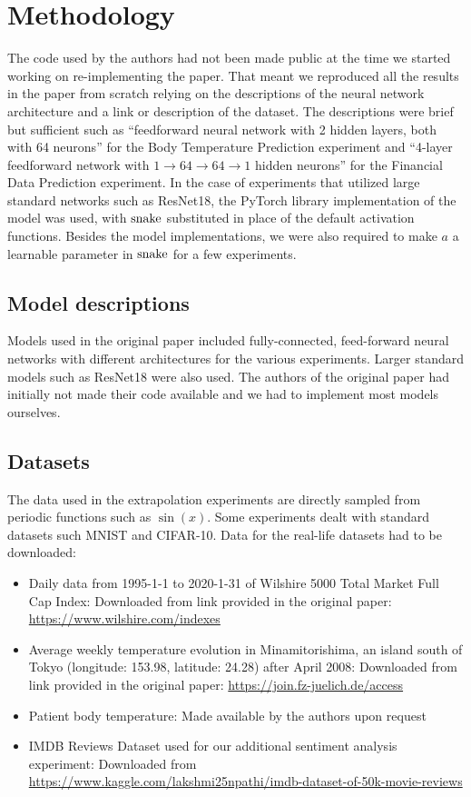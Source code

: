 \section{Methodology}

The code used by the authors had not been made public at the time we started working on re-implementing the paper. That meant we reproduced all the results in the paper from scratch relying on the descriptions of the neural network architecture and a link or description of the dataset.
The descriptions were brief but sufficient such as ``feedforward neural network with 2 hidden layers, both with 64 neurons'' for the Body Temperature Prediction experiment and ``4-layer feedforward network with $ 1 \rightarrow 64 \rightarrow 64 \rightarrow 1 $ hidden neurons'' for the Financial Data Prediction experiment. 
In the case of experiments that utilized large standard networks such as ResNet18, the PyTorch library implementation of the model was used, with $\operatorname{snake}$ substituted in place of the default activation functions.
Besides the model implementations, we were also required to make $a$ a learnable parameter in $ \operatorname{snake} $ for a few experiments.

\subsection{Model descriptions}

Models used in the original paper included fully-connected, feed-forward neural networks with different architectures for the various experiments. Larger standard models such as ResNet18 were also used. The authors of the original paper had initially not made their code available and we had to implement most models ourselves.

\subsection{Datasets}

The data used in the extrapolation experiments are directly sampled from periodic functions such as $\sin(x)$. Some experiments dealt with standard datasets such MNIST and CIFAR-10.
Data for the real-life datasets had to be downloaded:
\begin{itemize}

    \item Daily data from 1995-1-1 to 2020-1-31 of Wilshire 5000 Total Market Full Cap Index: Downloaded from link provided in the original paper: \url{https://www.wilshire.com/indexes}
    \item Average weekly temperature evolution in Minamitorishima, an island south of Tokyo (longitude: 153.98, latitude: 24.28) after April 2008: Downloaded from link provided in the original paper: \url{https://join.fz-juelich.de/access}
    \item Patient body temperature: Made available by the authors upon request
    \item IMDB Reviews Dataset used for our additional sentiment analysis experiment: Downloaded from \url{https://www.kaggle.com/lakshmi25npathi/imdb-dataset-of-50k-movie-reviews}
    
    
\end{itemize}

